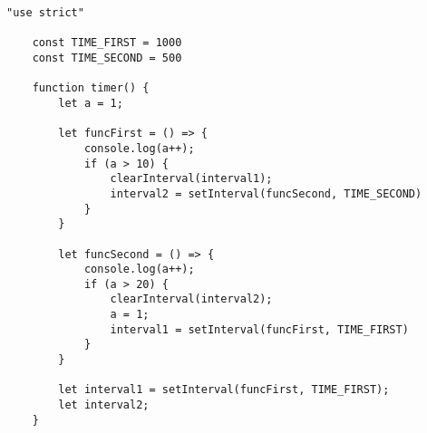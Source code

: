 \begin{lstlisting}[label=some-code,caption=Код программы. Задание 3]
	"use strict"

	const TIME_FIRST = 1000
	const TIME_SECOND = 500
	
	function timer() {
		let a = 1;
	
		let funcFirst = () => {
			console.log(a++);
			if (a > 10) {
				clearInterval(interval1);
				interval2 = setInterval(funcSecond, TIME_SECOND)
			}
		}
	
		let funcSecond = () => {
			console.log(a++);
			if (a > 20) {
				clearInterval(interval2);
				a = 1;
				interval1 = setInterval(funcFirst, TIME_FIRST)
			}
		}
	
		let interval1 = setInterval(funcFirst, TIME_FIRST);
		let interval2;
	}
	
\end{lstlisting}

